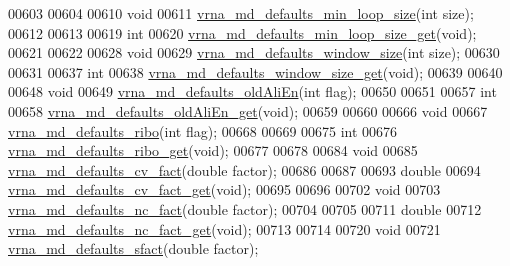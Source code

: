 \begin{DoxyCode}
00603 
00604 
00610 \textcolor{keywordtype}{void}
00611 \mbox{\hyperlink{group__model__details_gac152f1e78c1058a10261022c8dfda0f7}{vrna\_md\_defaults\_min\_loop\_size}}(\textcolor{keywordtype}{int} size);
00612 
00613 
00619 \textcolor{keywordtype}{int}
00620 \mbox{\hyperlink{group__model__details_ga5cc691174a75c652807dc361b617632a}{vrna\_md\_defaults\_min\_loop\_size\_get}}(\textcolor{keywordtype}{void});
00621 
00622 
00628 \textcolor{keywordtype}{void}
00629 \mbox{\hyperlink{group__model__details_ga7b802ce0e8c3181bf5cb580de6d5b26a}{vrna\_md\_defaults\_window\_size}}(\textcolor{keywordtype}{int} size);
00630 
00631 
00637 \textcolor{keywordtype}{int}
00638 \mbox{\hyperlink{group__model__details_ga670146a9aa3ba77f4d422d60b7c30ac9}{vrna\_md\_defaults\_window\_size\_get}}(\textcolor{keywordtype}{void});
00639 
00640 
00648 \textcolor{keywordtype}{void}
00649 \mbox{\hyperlink{group__model__details_ga41521d5b9fb7e0f31e7ea73f5792afab}{vrna\_md\_defaults\_oldAliEn}}(\textcolor{keywordtype}{int} flag);
00650 
00651 
00657 \textcolor{keywordtype}{int}
00658 \mbox{\hyperlink{group__model__details_ga2374492b5019df88022fe4c05f0f3630}{vrna\_md\_defaults\_oldAliEn\_get}}(\textcolor{keywordtype}{void});
00659 
00660 
00666 \textcolor{keywordtype}{void}
00667 \mbox{\hyperlink{group__model__details_ga937c45e1d06fd6168730a9b08d130be3}{vrna\_md\_defaults\_ribo}}(\textcolor{keywordtype}{int} flag);
00668 
00669 
00675 \textcolor{keywordtype}{int}
00676 \mbox{\hyperlink{group__model__details_ga169027f0c0561ea7d87b655e4b336bfc}{vrna\_md\_defaults\_ribo\_get}}(\textcolor{keywordtype}{void});
00677 
00678 
00684 \textcolor{keywordtype}{void}
00685 \mbox{\hyperlink{group__model__details_gad3a3f40baafd91a6ce80a91a68e20053}{vrna\_md\_defaults\_cv\_fact}}(\textcolor{keywordtype}{double} factor);
00686 
00687 
00693 \textcolor{keywordtype}{double}
00694 \mbox{\hyperlink{group__model__details_gae59c68393807217b0a2497adb64d3ee3}{vrna\_md\_defaults\_cv\_fact\_get}}(\textcolor{keywordtype}{void});
00695 
00696 
00702 \textcolor{keywordtype}{void}
00703 \mbox{\hyperlink{group__model__details_gac35e596c850dce3ad55c49119fd7d471}{vrna\_md\_defaults\_nc\_fact}}(\textcolor{keywordtype}{double} factor);
00704 
00705 
00711 \textcolor{keywordtype}{double}
00712 \mbox{\hyperlink{group__model__details_ga7ac759eaa7159bf5f022745f5da59508}{vrna\_md\_defaults\_nc\_fact\_get}}(\textcolor{keywordtype}{void});
00713 
00714 
00720 \textcolor{keywordtype}{void}
00721 \mbox{\hyperlink{group__model__details_ga3f73d3029d3d0025d4cc311510cd95a3}{vrna\_md\_defaults\_sfact}}(\textcolor{keywordtype}{double} factor);

\end{DoxyCode}
